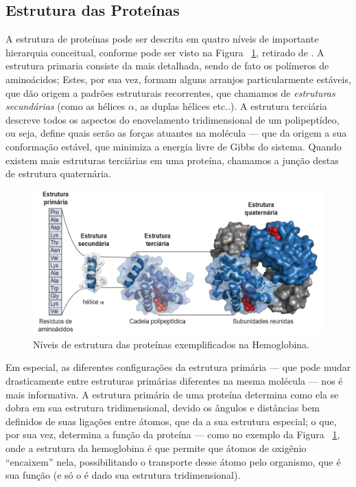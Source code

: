 \documentclass[a4paper,12pt]{article}
\begin{document}
	\subsection{Estrutura das Proteínas}
	A estrutura de proteínas pode ser descrita em quatro níveis de importante hierarquia conceitual, conforme pode ser visto na Figura ~\ref{fig:protest}, retirado de \cite{bioquimicaLehninger}. A estrutura primaria consiste da mais detalhada, sendo de fato os polímeros de aminoácidos; Estes, por sua vez, formam alguns arranjos particularmente estáveis, que dão origem a padrões estruturais recorrentes, que chamamos de \textit{estruturas secundárias} (como as hélices $\alpha$, as duplas hélices etc..). A estrutura terciária descreve todos os aspectos do enovelamento tridimensional de um polipeptídeo, ou seja, define quais serão as forças atuantes na molécula --- que da origem a sua conformação estável, que minimiza a energia livre de Gibbs do sistema. Quando existem mais estruturas terciárias em uma proteína, chamamos a junção destas de estrutura quaternária.	
	
	\begin{figure}[H]
		\begin{center}
			\includegraphics[width=1\linewidth]{protest.png}
		\end{center}
		\caption{Níveis de estrutura das proteínas exemplificados na Hemoglobina.}
		\label{fig:protest}
	\end{figure}
	
	Em especial, as diferentes configurações da estrutura primária --- que pode mudar drasticamente entre estruturas primárias diferentes na mesma molécula --- nos é mais informativa. A estrutura primária de uma proteína determina como ela se dobra em sua estrutura tridimensional, devido os ângulos e distâncias bem definidos de suas ligações entre átomos, que da a sua estrutura especial; o que, por sua vez, determina a função da proteína --- como no exemplo da Figura ~\ref{fig:protest}, onde a estrutura da hemoglobina é que permite que átomos de oxigênio ``encaixem'' nela, possibilitando o transporte desse átomo pelo organismo, que é sua função (e só o é dado sua estrutura tridimensional). 
	
\end{document}
